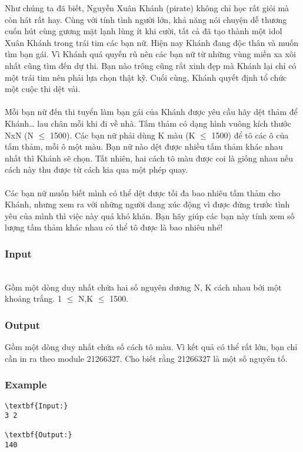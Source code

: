



   Như chúng ta đã biết, Nguyễn Xuân Khánh (pirate) không chỉ học rất giỏi mà còn hát rất hay. Cùng với tính tình người lớn, khả năng nói chuyện dễ thương cuốn hút cùng gương mặt lạnh lùng ít khi cười, tất cả đã tạo thành một idol Xuân Khánh trong trái tim các bạn nữ. Hiện nay Khánh đang độc thân và muốn tìm bạn gái. Vì Khánh quá quyến rũ nên các bạn nữ từ những vùng miền xa xôi nhất cũng tìm đến dự thi. Bạn nào trông cũng rất xinh đẹp mà Khánh lại chỉ có một trái tim nên phải lựa chọn thật kỹ. Cuối cùng, Khánh quyết định tổ chức một cuộc thi dệt vải.   
\\
\\   Mỗi bạn nữ đến thi tuyển làm bạn gái của Khánh được yêu cầu hãy dệt thảm để Khánh… lau chân mỗi khi đi về nhà. Tấm thảm có dạng hình vuông kích thước NxN (N $\le$ 1500). Các bạn nữ phải dùng K màu (K $\le$ 1500) để tô các ô của tấm thảm, mỗi ô một màu. Bạn nữ nào dệt được nhiều tấm thảm khác nhau nhất thì Khánh sẽ chọn. Tất nhiên, hai cách tô màu được coi là giống nhau nếu cách này thu được từ cách kia qua một phép quay.   
\\
\\   Các bạn nữ muốn biết mình có thể dệt được tối đa bao nhiêu tấm thảm cho Khánh, nhưng xem ra với những người đang xúc động vì được đứng trước tình yêu của mình thì việc này quá khó khăn. Bạn hãy giúp các bạn này tính xem số lượng tấm thảm khác nhau có thể tô được là bao nhiêu nhé!  

\subsubsection{   Input  }


\\   Gồm một dòng duy nhất chứa hai số nguyên dương N, K cách nhau bởi một khoảng trắng. 1 $\le$ N,K $\le$ 1500.  

\subsubsection{   Output  }

   Gồm một dòng duy nhất chứa số cách tô màu. Vì kết quả có thể rất lớn, bạn chỉ cần in ra theo module 21266327. Cho biết rằng 21266327 là một số nguyên tố.  

\subsubsection{   Example  }
\begin{verbatim}
\textbf{Input:}
3 2

\textbf{Output:}
140
\end{verbatim}
